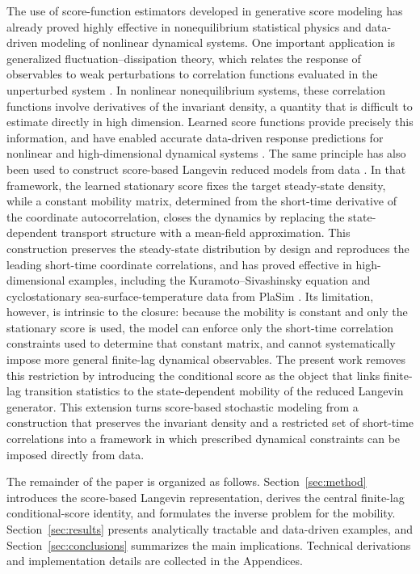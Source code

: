 \documentclass[11pt,twoside,fleqn]{article}
\begin{document}
The use of score-function estimators developed in generative score modeling has already proved highly effective in nonequilibrium statistical physics and data-driven modeling of nonlinear dynamical systems. One important application is generalized fluctuation--dissipation theory, which relates the response of observables to weak perturbations to correlation functions evaluated in the unperturbed system \cite{Kubo1966FDT,marconi2008,Ruelle1998,Ruelle2009,majda2009,majdaStructuralStability,MajdaBook,GRITSUN,cooper2011climate,LucariniChekroun2023}. In nonlinear nonequilibrium systems, these correlation functions involve derivatives of the invariant density, a quantity that is difficult to estimate directly in high dimension. Learned score functions provide precisely this information, and have enabled accurate data-driven response predictions for nonlinear and high-dimensional dynamical systems \cite{giorgini_response_theory,giorgini2025probdist,giorgini2025calibration}. The same principle has also been used to construct score-based Langevin reduced models from data \cite{giorgini2026scorelangevin, del2025integrating}. In that framework, the learned stationary score fixes the target steady-state density, while a constant mobility matrix, determined from the short-time derivative of the coordinate autocorrelation, closes the dynamics by replacing the state-dependent transport structure with a mean-field approximation. This construction preserves the steady-state distribution by design and reproduces the leading short-time coordinate correlations, and has proved effective in high-dimensional examples, including the Kuramoto--Sivashinsky equation and cyclostationary sea-surface-temperature data from PlaSim \cite{giorgini2025cyclostationary}. Its limitation, however, is intrinsic to the closure: because the mobility is constant and only the stationary score is used, the model can enforce only the short-time correlation constraints used to determine that constant matrix, and cannot systematically impose more general finite-lag dynamical observables. The present work removes this restriction by introducing the conditional score as the object that links finite-lag transition statistics to the state-dependent mobility of the reduced Langevin generator. This extension turns score-based stochastic modeling from a construction that preserves the invariant density and a restricted set of short-time correlations into a framework in which prescribed dynamical constraints can be imposed directly from data.

The remainder of the paper is organized as follows.
Section~\ref{sec:method} introduces the score-based Langevin representation,
derives the central finite-lag conditional-score identity, and formulates the
inverse problem for the mobility.
Section~\ref{sec:results} presents analytically tractable and data-driven
examples, and Section~\ref{sec:conclusions} summarizes the main implications.
Technical derivations and implementation details are collected in the
Appendices.
\end{document}
